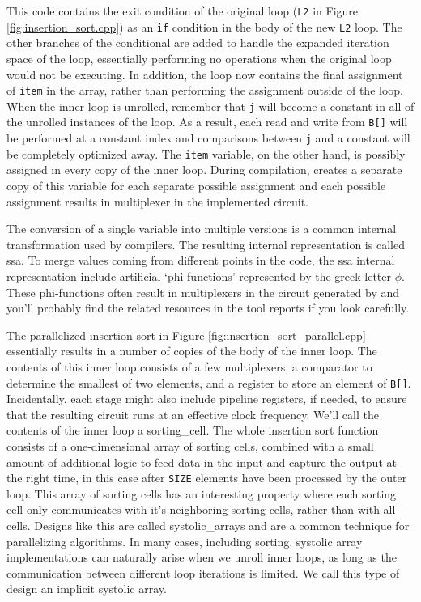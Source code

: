 This code contains the exit condition of the original loop (\lstinline{L2} in Figure \ref{fig:insertion_sort.cpp}) as an \lstinline{if} condition in the body of the new \lstinline{L2} loop.  The other branches of the conditional are added to handle the expanded iteration space of the loop, essentially performing no operations when the original loop would not be executing.  In addition, the loop now contains the final assignment of \lstinline{item} in the array, rather than performing the assignment outside of the loop.  When the inner loop is unrolled, remember that \lstinline{j} will become a constant in all of the unrolled instances of the loop.  As a result, each read and write from \lstinline{B[]} will be performed at a constant index and comparisons between \lstinline{j} and a constant will be completely optimized away.  The \lstinline{item} variable, on the other hand, is possibly assigned in every copy of the inner loop.  During compilation, \VHLS creates a separate copy of this variable for each separate possible assignment and each possible assignment results in multiplexer in the implemented circuit.

\begin{aside}
The conversion of a single variable into multiple versions is a common internal transformation used by compilers.  The resulting internal representation is called \gls{ssa}.  To merge values coming from different points in the code, the \gls{ssa} internal representation include artificial `phi-functions' represented by the greek letter $\phi$.  These phi-functions often result in multiplexers in the circuit generated by \VHLS and you'll probably find the related resources in the tool reports if you look carefully.
\end{aside}

The parallelized insertion sort in Figure \ref{fig:insertion_sort_parallel.cpp} essentially results in a number of copies of the body of the inner loop.   The contents of this inner loop consists of a few multiplexers, a comparator to determine the smallest of two elements, and a register to store an element of \lstinline{B[]}.  Incidentally, each stage might also include pipeline registers, if needed, to ensure that the resulting circuit runs at an effective clock frequency.  We'll call the contents of the inner loop a \gls{sorting_cell}.  The whole insertion sort function consists of a one-dimensional array of sorting cells, combined with a small amount of additional logic to feed data in the input and capture the output at the right time, in this case after \lstinline{SIZE} elements have been processed by the outer loop.  This array of sorting cells has an interesting property where each sorting cell only communicates with it's neighboring sorting cells, rather than with all cells.  Designs like this are called \glspl{systolic_array} and are a common technique for parallelizing algorithms. In many cases, including sorting, systolic array implementations can naturally arise when we unroll inner loops, as long as the communication between different loop iterations is limited.   We call this type of design an implicit systolic array.

